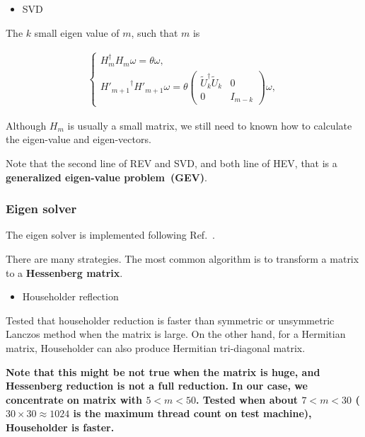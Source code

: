 \begin{itemize}
  \item SVD
\end{itemize}

The $k$ small eigen value of $m$, such that $m$ is

\begin{equation}
\begin{split}
\left\{\begin{array}{l}
H_m^{\dagger}H_m\omega = \theta \omega,\\
{H'_{m+1}}^{\dagger}H'_{m+1}\omega = \theta \left(\begin{array}{cc} \tilde{U}_k^{\dagger}\tilde{U}_{k}  & 0 \\ 0 & I_{m-k}\end{array}\right)\omega,
\end{array}\right.
\end{split}
\end{equation}

Although $H_m$ is usually a small matrix, we still need to known how to calculate the eigen-value and eigen-vectors.

Note that the second line of REV and SVD, and both line of HEV, that is a \textbf{generalized eigen-value problem~(GEV)}.

\subsubsection{\label{sec:eigenSolver}Eigen solver}

The eigen solver is implemented following Ref.~\cite{matrixcomputation}.

There are many strategies. The most common algorithm is to transform a matrix to a \textbf{Hessenberg matrix}.

\begin{itemize}
  \item {}Householder reflection
\end{itemize}

Tested that householder reduction is faster than symmetric or unsymmetric Lanczos method when the matrix is large. On the other hand, for a Hermitian matrix, Householder can also produce Hermitian tri-diagonal matrix.

\textbf{Note that this might be not true when the matrix is huge, and Hessenberg reduction is not a full reduction. In our case, we concentrate on matrix with $5<m<50$. Tested when about $7<m<30$ ($30 \times 30 \approx 1024$ is the maximum thread count on test machine), Householder is faster.}

